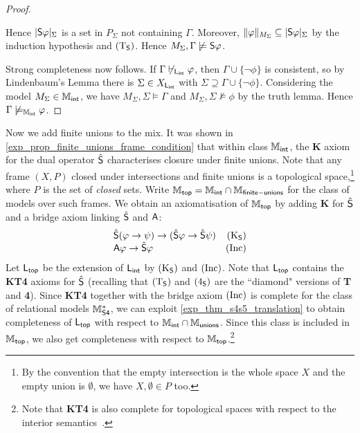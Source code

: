 \begin{proof}
\begin{itemize}
    Hence $|\S\phi|_\Sigma$ is a set in $P_\Sigma$ not containing
    $\Gamma$. Moreover, $\|\phi\|_{M_\Sigma} \subseteq
    |\S\phi|_\Sigma$ by the induction hypothesis and $\Tsoundness$.
    Hence $M_\Sigma, \Gamma \not\models \S\phi$.
    \end{itemize}

    Strong completeness now follows. If $\Gamma \not\entails_{\sLint} \phi$, then
    $\Gamma \cup \{\neg\phi\}$ is consistent, so by Lindenbaum's Lemma
    there is $\Sigma \in X_{\sLint}$ with $\Sigma \supseteq \Gamma \cup
    \{\neg\phi\}$.  Considering the model $M_\Sigma \in \Mint$, we have
    $M_\Sigma, \Sigma \models \Gamma$ and $M_\Sigma, \Sigma \not\models
    \phi$ by the truth lemma. Hence $\Gamma \not\models_{\Mint} \phi$.
\end{proof}

Now we add finite unions to the mix. It was shown in
\cref{exp_prop_finite_unions_frame_condition} that within class $\Mint$, the
\textbf{K} axiom for the dual operator $\hat\S$ characterises closure under
finite unions. Note that any frame $(X, P)$ closed under intersections and
finite unions is a topological space,\footnote{By the convention that the empty
intersection is the whole space $X$ and the empty union is $\emptyset$, we have
$X, \emptyset \in P$ too.} where $P$ is the set of \emph{closed} sets. Write
$\Mtop = \Mint \cap \Mfunions$ for the class of models over such frames. We
obtain an axiomatisation of $\Mtop$ by adding \textbf{K} for $\hat\S$ and a
bridge axiom linking $\hat\S$ and $\A$:
\[
    \begin{array}{lr}
        \hat{\S}(\phi \limplies \psi) \limplies (\hat{\S}\phi \limplies \hat{\S}\psi)
            & \Ksoundness \\
        \A\phi \limplies \hat\S\phi
    & \inc
    \end{array}
\]
Let $\sLtop$ be the extension
of $\sLint$ by $\Ksoundness$ and $\inc$. Note that $\sLtop$ contains the
\textbf{KT4} axioms for $\hat\S$ (recalling that $\Tsoundness$ and
$\foursoundness$ are the ``diamond" versions of \textbf{T} and \textbf{4}).
Since \textbf{KT4} together with the bridge axiom $\inc$ is complete for the
class of relational models $\Msfour$, we can exploit
\cref{exp_thm_s4s5_translation} to obtain completeness of $\sLtop$ with respect to
$\Mint \cap \Munions$. Since this class is included in $\Mtop$, we also get
completeness with respect to $\Mtop$.\footnote{Note that \textbf{KT4} is also
complete for topological spaces with respect to the interior
semantics~\cite{van2007modal}.}

